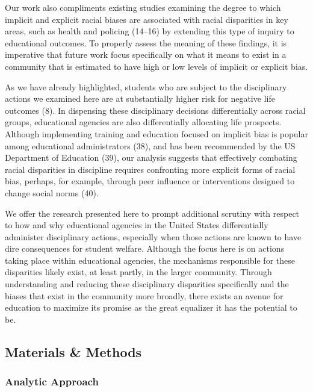 \documentclass[9pt,twocolumn,twoside,lineno]{pnas-new}
\begin{document}
Our work also compliments existing studies examining the degree to which
implicit and explicit racial biases are associated with racial
disparities in key areas, such as health and policing (14--16) by
extending this type of inquiry to educational outcomes. To properly
assess the meaning of these findings, it is imperative that future work
focus specifically on what it means to exist in a community that is
estimated to have high or low levels of implicit or explicit bias.

As we have already highlighted, students who are subject to the
disciplinary actions we examined here are at substantially higher risk
for negative life outcomes (8). In dispensing these disciplinary
decisions differentially across racial groups, educational agencies are
also differentially allocating life prospects. Although implementing
training and education focused on implicit bias is popular among
educational administrators (38), and has been recommended by the US
Department of Education (39), our analysis suggests that effectively
combating racial disparities in discipline requires confronting more
explicit forms of racial bias, perhaps, for example, through peer
influence or interventions designed to change social norms (40).

We offer the research presented here to prompt additional scrutiny with
respect to how and why educational agencies in the United States
differentially administer disciplinary actions, especially when those
actions are known to have dire consequences for student welfare.
Although the focus here is on actions taking place within educational
agencies, the mechanisms responsible for these disparities likely exist,
at least partly, in the larger community. Through understanding and
reducing these disciplinary disparities specifically and the biases that
exist in the community more broadly, there exists an avenue for
education to maximize its promise as the great equalizer it has the
potential to be.

\subsection{Materials \& Methods}\label{materials-methods}

\subsubsection{Analytic Approach}\label{analytic-approach}
\end{document}
